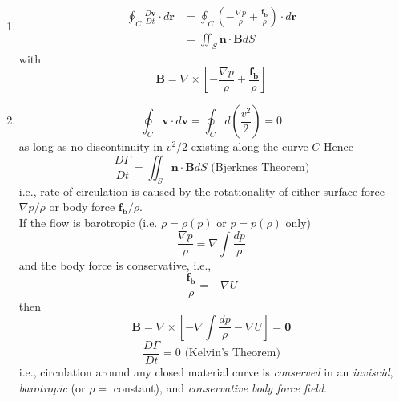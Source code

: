 \begin{enumerate}[label = \protect\circled{\arabic*}]
\item
\begin{align*}
\oint_C\frac{D\mathbf{v}}{Dt}\cdot d\mathbf{r}
&= \oint_C\left(-\frac{\nabla p}{\rho} + \frac{\mathbf{f_b}}{\rho}\right)\cdot d\mathbf{r} \\
&= \iint_S\mathbf{n}\cdot\mathbf{B} dS
\end{align*}
with
\[
\mathbf{B} = \nabla\times\left[-\frac{\nabla p}{\rho} + \frac{\mathbf{f_b}}{\rho}\right]
\]
\item
\[
\oint_C\mathbf{v}\cdot d\mathbf{v} = \oint_C d\left(\frac{v^2}{2}\right) = 0
\]
as long as no discontinuity in $v^2/2$ existing along the curve $C$
Hence
\begin{equation}
\boxed{\frac{D\Gamma}{Dt} = \iint_S\mathbf{n}\cdot\mathbf{B} dS} \text{ (Bjerknes Theorem)}
\label{eq: 3-2-6}
\end{equation}
i.e., rate of circulation is caused by the rotationality of either surface force $\nabla p /\rho$ or body force $\mathbf{f_b}/\rho$.\\
If the flow is barotropic (i.e. $\rho = \rho (p)$ or $p = p(\rho)$ only)
\[
\frac{\nabla p}{\rho} = \nabla\int\frac{dp}{\rho}
\]
and the body force is conservative, i.e., 
\[
\frac{\mathbf{f_b}}{\rho} = -\nabla U
\]
then
\[
\mathbf{B} = \nabla\times\left[-\nabla\int\frac{dp}{\rho} - \nabla U\right] = \mathbf{0}
\]
\begin{equation}
\boxed{
\frac{D\Gamma}{Dt} = 0
}\text{ (Kelvin's Theorem)}
\label{eq: 3-2-7}
\end{equation}
i.e., circulation around any closed material curve is \emph{conserved} in an \emph{inviscid}, \emph{barotropic} (or $\rho =$ constant), and \emph{conservative body force field}. 
%
\end{enumerate}


